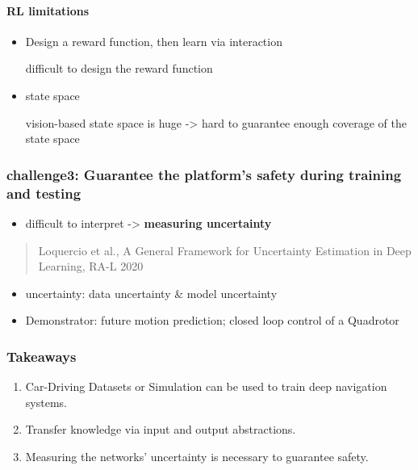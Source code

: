 \documentclass[]{article}
\let\oldparagraph\paragraph
\renewcommand{\paragraph}[1]{\oldparagraph{#1}\mbox{}}
\begin{document}
\paragraph{RL limitations}\label{header-n2773}

\begin{itemize}
\item
  Design a reward function, then learn via interaction

  difficult to design the reward function
\item
  state space

  vision-based state space is huge -\textgreater{} hard to guarantee
  enough coverage of the state space
\end{itemize}

\subsubsection{challenge3: Guarantee the platform's safety during
training and testing}\label{header-n2781}

\begin{itemize}
\item
  difficult to interpret -\textgreater{} \textbf{measuring uncertainty}
\end{itemize}

\begin{quote}
Loquercio et al., A General Framework for Uncertainty Estimation in Deep
Learning, RA-L 2020
\end{quote}

\begin{itemize}
\item
  uncertainty: data uncertainty \& model uncertainty
\item
  Demonstrator: future motion prediction; closed loop control of a
  Quadrotor
\end{itemize}

\subsubsection{Takeaways}\label{header-n2792}

\begin{enumerate}
\def\labelenumi{\arabic{enumi}.}
\item
  Car-Driving Datasets or Simulation can be used to train deep
  navigation systems.
\item
  Transfer knowledge via input and output abstractions.
\item
  Measuring the networks' uncertainty is necessary to guarantee safety.
\end{enumerate}
\end{document}
